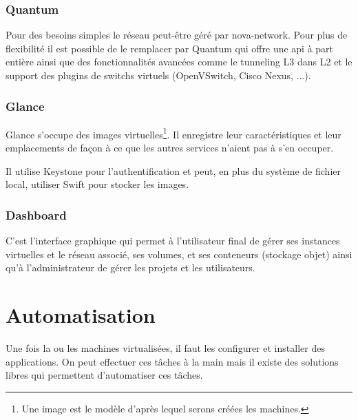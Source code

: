 \documentclass[a4paper,oneside]{report}
\begin{document}
\subsubsection{Quantum}
Pour des besoins simples le réseau peut-être géré par nova-network. Pour plus de flexibilité il  est possible de le remplacer par Quantum qui offre une \gls{api} à part entière ainsi que des fonctionnalités avancées comme le tunneling L3 dans L2 et le support des plugins de switchs virtuels (OpenVSwitch, Cisco Nexus, ...).

\subsubsection{Glance}
Glance s'occupe des images virtuelles\footnote{Une image est le modèle d'après lequel serons créées les machines.}.
Il enregistre leur caractéristiques et leur emplacements de façon à ce que les autres services n'aient pas à s'en occuper.

Il utilise Keystone pour l'authentification et peut, en plus du système de fichier local, utiliser Swift pour stocker les images.

\subsubsection{Dashboard}
C'est l'interface graphique qui permet à l'utilisateur final de gérer ses instances virtuelles et le réseau associé, ses volumes, et ses conteneurs (stockage objet) ainsi qu'à l'administrateur de gérer les projets et les utilisateurs.

\section{Automatisation}

Une fois la ou les machines virtualisées, il faut les configurer et installer des applications. On peut effectuer ces tâches à la main mais il existe des solutions libres qui permettent d'automatiser ces tâches.
\end{document}
